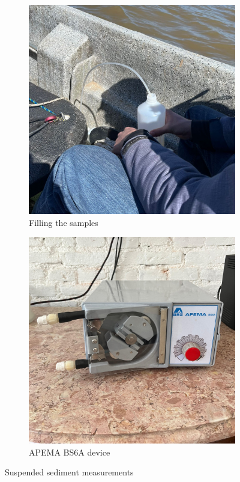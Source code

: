 \begin{figure}[H]
    \centering
    \begin{subfigure}[t]{0.48\textwidth}
        \centering
        \includegraphics[width=\linewidth]{figures/ch4/fles.jpg}
        \caption{Filling the samples}
    \end{subfigure}
    \hfill
    \begin{subfigure}[t]{0.48\textwidth}
        \centering
        \includegraphics[width=\linewidth]{figures/ch4/APEMA BS6A.jpg}
        \caption{APEMA BS6A device}
    \end{subfigure}
    \caption{Suspended sediment measurements}
    \label{fig:suspended-sediment}
\end{figure}




